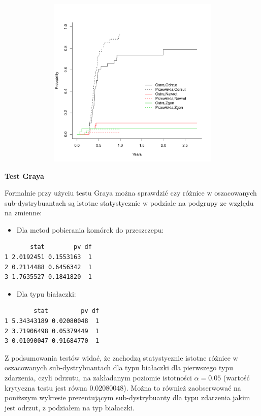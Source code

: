 \documentclass[]{article}
\begin{document}
\includegraphics[width=16cm,height=8.2cm]{plot2.pdf} \newpage

\textbf{Test Graya}

Formalnie przy użyciu testu Graya można sprawdzić czy różnice w
oszacowanych sub-dystrybuantach są istotne statystycznie w podziale na
podgrupy ze względu na zmienne:

\begin{itemize}
\itemsep1pt\parskip0pt
\item
  Dla metod pobierania komórek do przeszczepu:
\end{itemize}

\begin{verbatim}
       stat        pv df
1 2.0192451 0.1553163  1
2 0.2114488 0.6456342  1
3 1.7635527 0.1841820  1
\end{verbatim}

\begin{itemize}
\itemsep1pt\parskip0pt
\item
  Dla typu białaczki:
\end{itemize}

\begin{verbatim}
        stat         pv df
1 5.34343189 0.02080048  1
2 3.71906498 0.05379449  1
3 0.01090047 0.91684770  1
\end{verbatim}

Z podsumowania testów widać, że zachodzą statystycznie istotne różnice w
oszacowanych sub-dystrybuantach dla typu białaczki dla pierwszego typu
zdarzenia, czyli odrzutu, na zakładanym poziomie istotności
$\alpha=0.05$ (wartość krytyczna testu jest równa $0.02080048$). Można
to również zaobserwować na poniższym wykresie prezentującym
sub-dystrybuanty dla typu zdarzenia jakim jest odrzut, z podziałem na
typ białaczki.
\end{document}
